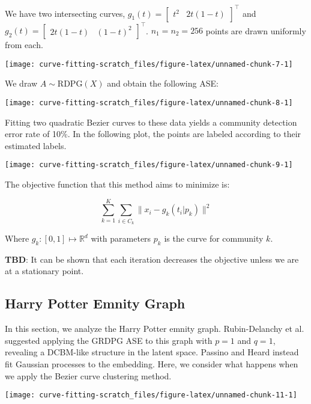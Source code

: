 \documentclass[
  11pt,
]{article}
\begin{document}
\begin{example}



We have two intersecting curves, $g_1(t) = \begin{bmatrix} t^2 & 2 t (1 - t) \end{bmatrix}^\top$ and $g_2(t) = \begin{bmatrix} 2 t (1 - t) & (1 - t) ^ 2 \end{bmatrix}^\top$. $n_1 = n_2 = 256$ points are drawn uniformly from each.


\begin{center}\texttt{[image: curve-fitting-scratch\_files/figure-latex/unnamed-chunk-7-1]} \end{center}

We draw $A \sim \mathrm{RDPG}(X)$ and obtain the following ASE:


\begin{center}\texttt{[image: curve-fitting-scratch\_files/figure-latex/unnamed-chunk-8-1]} \end{center}

Fitting two quadratic Bezier curves to these data yields a community detection error rate of 10\%. 
In the following plot, the points are labeled according to their estimated labels.


\begin{center}\texttt{[image: curve-fitting-scratch\_files/figure-latex/unnamed-chunk-9-1]} \end{center}

\end{example}

The objective function that this method aims to minimize is:

\[\sum_{k=1}^K \sum_{i \in C_k} \|x_i - g_k(t_i | p_k)\|^2\]

Where \(g_k : [0, 1] \mapsto \mathbb{R}^d\) with parameters \(p_k\) is
the curve for community \(k\).

\textbf{TBD}: It can be shown that each iteration decreases the
objective unless we are at a stationary point.

\hypertarget{harry-potter-emnity-graph}{%
\subsection{Harry Potter Emnity Graph}\label{harry-potter-emnity-graph}}

\begin{example}
In this section, we analyze the Harry Potter emnity graph. 
Rubin-Delanchy et al. suggested applying the GRDPG ASE to this graph with $p = 1$ and $q = 1$, revealing a DCBM-like structure in the latent space. 
Passino and Heard instead fit Gaussian processes to the embedding. 
Here, we consider what happens when we apply the Bezier curve clustering method. 
\end{example}

\begin{center}\texttt{[image: curve-fitting-scratch\_files/figure-latex/unnamed-chunk-11-1]} \end{center}

  
\end{document}
